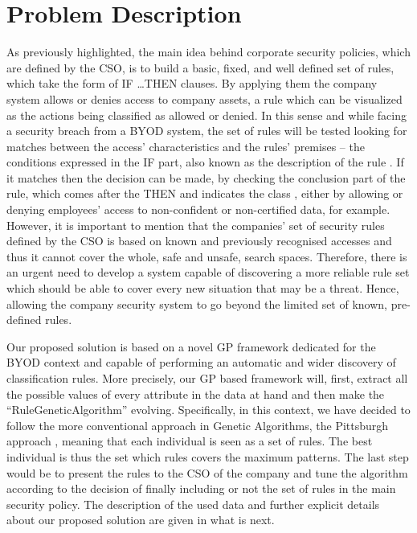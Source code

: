 \documentclass[a4paper,10pt,twocolumn,preprint,3p]{elsarticle}
\begin{document}
\section{Problem Description}
\label{sec:problem}

As previously highlighted, the main idea behind corporate security
policies, which are defined by the CSO, is to build a basic, fixed,
and well defined set of rules, which take the form of \textsc{IF
  \ldots THEN} clauses. By applying them the company system allows or
denies access to company assets, %
a rule which can be visualized as the actions being classified as
allowed or denied. In this sense and while facing a security breach
from a BYOD system, the set of rules will be tested looking for
matches between the access' characteristics and the rules' premises --
the conditions expressed in the IF part, also known as the description
of the rule \cite{DeFalco2002257}. If it matches then the decision can
be made, by checking the conclusion part of the rule, which comes
after the THEN and indicates the class \cite{DeFalco2002257}, either
by allowing or denying employees' access to non-confident %
 or non-certified data, for example. However, it is important to
 mention that the companies'  set of security rules defined by the CSO is
 based on known and previously recognised accesses and thus it cannot
 cover the whole, safe and unsafe, search spaces. Therefore,
 there is an urgent need to develop a system capable of discovering a
 more reliable rule set which should be able to cover every new
 situation that may be a threat. Hence, allowing the company security
 system to go beyond the limited set of known, pre-defined rules.  %

Our proposed solution is based on a novel GP framework dedicated for
the BYOD context and capable of performing an automatic and wider discovery of classification rules. More precisely, our GP based framework will, first, extract all the possible values of every attribute in the data at hand and then make the ``RuleGeneticAlgorithm'' evolving. %
Specifically, in this context, we have decided to follow the more
conventional approach in Genetic Algorithms, the Pittsburgh approach
\cite{freitas2002data}, meaning that each individual is seen as a set
of rules. The best individual is thus the set which rules covers the
maximum patterns. The last step would be to present the rules to the
CSO of the company and tune the algorithm according to the decision of
finally including or not the set of rules in the main security
policy. The description of the used data and further explicit details
about our proposed solution are given in what is next. %
\end{document}

